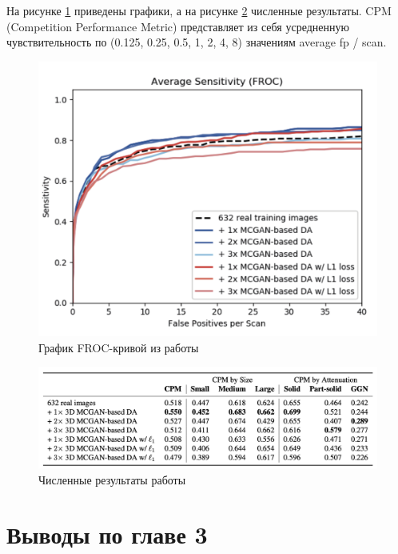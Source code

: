 На рисунке \ref{han-froc-plot} приведены графики, а на рисунке \ref{han-cpm} численные результаты. CPM (Competition Performance Metric) представляет из себя усредненную чувствительность по (0.125, 0.25, 0.5, 1, 2, 4, 8) значениям average fp / scan.

\begin{figure}[!h]
\includegraphics[width=\linewidth]{images/mcgan-results.png}
\caption{График FROC-кривой из работы \cite{han2019synthesizing}}\label{han-froc-plot}
\centering
\end{figure}

\begin{figure}[!h]
\includegraphics[width=\linewidth]{images/han-cpm.png}
\caption{Численные результаты работы \cite{han2019synthesizing}}\label{han-cpm}
\centering
\end{figure}

\section{Выводы по главе 3}

